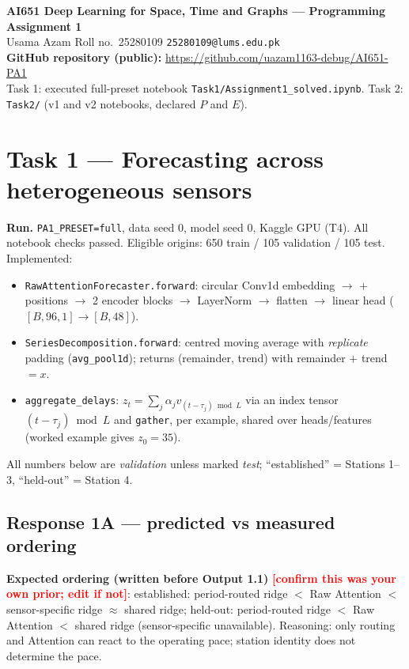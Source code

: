 \documentclass[10.5pt,a4paper]{article}
\newcommand{\fix}[1]{\textcolor{red}{\textbf{[#1]}}}
\begin{document}
\begin{center}
{\Large\bfseries AI651 Deep Learning for Space, Time and Graphs --- Programming Assignment 1}\\[4pt]
{\large Usama Azam \quad Roll no.\ 25280109 \quad \texttt{25280109@lums.edu.pk}}\\[4pt]
\textbf{GitHub repository (public):} \url{https://github.com/uazam1163-debug/AI651-PA1}\\[2pt]
{\small Task 1: executed full-preset notebook \texttt{Task1/Assignment1\_solved.ipynb}. Task 2: \texttt{Task2/} (v1 and v2 notebooks, declared $P$ and $E$).}
\end{center}

\section*{Task 1 --- Forecasting across heterogeneous sensors}

\textbf{Run.} \texttt{PA1\_PRESET=full}, data seed 0, model seed 0, Kaggle GPU (T4). All notebook checks passed.
Eligible origins: 650 train / 105 validation / 105 test. Implemented:
\begin{itemize}
\item \texttt{RawAttentionForecaster.forward}: circular Conv1d embedding $\to$ $+$ positions $\to$ 2 encoder blocks $\to$ LayerNorm $\to$ flatten $\to$ linear head ($[B,96,1]\to[B,48]$).
\item \texttt{SeriesDecomposition.forward}: centred moving average with \emph{replicate} padding (\texttt{avg\_pool1d}); returns (remainder, trend) with remainder $+$ trend $=x$.
\item \texttt{aggregate\_delays}: $z_t=\sum_j \alpha_j v_{(t-\tau_j)\bmod L}$ via an index tensor $(t-\tau_j)\bmod L$ and \texttt{gather}, per example, shared over heads/features (worked example gives $z_0=35$).
\end{itemize}
All numbers below are \emph{validation} unless marked \emph{test}; ``established'' = Stations 1--3, ``held-out'' = Station 4.

\subsection*{Response 1A --- predicted vs measured ordering}

\textbf{Expected ordering (written before Output 1.1)} \fix{confirm this was your own prior; edit if not}:
established: period-routed ridge $<$ Raw Attention $<$ sensor-specific ridge $\approx$ shared ridge;
held-out: period-routed ridge $<$ Raw Attention $<$ shared ridge (sensor-specific unavailable).
Reasoning: only routing and Attention can react to the operating pace; station identity does not determine the pace.
\end{document}
